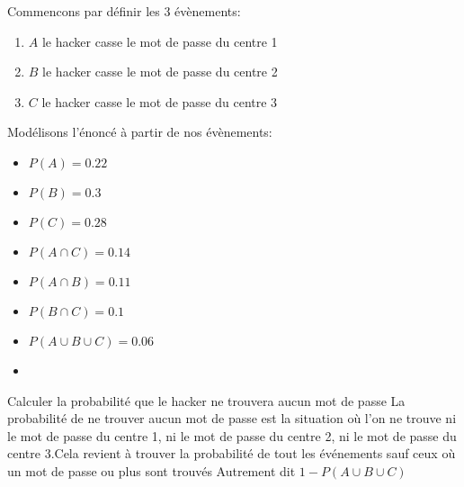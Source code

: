 \begin{exo}

    Commencons par définir les 3 évènements:
    \begin{enumerate}
        \item $A$ le hacker casse le mot de passe du centre 1
        \item $B$ le hacker casse le mot de passe du centre 2
        \item $C$ le hacker casse le mot de passe du centre 3
    \end{enumerate}
    Modélisons l'énoncé à partir de nos évènements:
    \begin{multicols}{2}
        \begin{itemize}
            \item $P(A) = 0.22$
            \item $P(B) = 0.3$
            \item $P(C) = 0.28$
            \item $P(A \cap C) = 0.14$  
            \item $P(A \cap B) = 0.11$ 
            \item $P(B \cap C) = 0.1$ 
            \item $P(A\cup B \cup C) = 0.06$
            \item[\vspace{\fill}]
        \end{itemize}
    \end{multicols}
    \begin{subexo}{Calculer la probabilité que le hacker ne trouvera aucun mot de passe}
        La probabilité de ne trouver aucun mot de passe est la situation où l'on ne trouve ni le mot de passe du centre 1, ni le mot de passe du centre 2, ni le mot de passe du centre 3.Cela revient à trouver la probabilité de tout les événements sauf ceux où un mot de passe ou plus sont trouvés Autrement dit $1 - P(A\cup B \cup C)$ 
        \newline

\end{subexo}
\end{exo}
